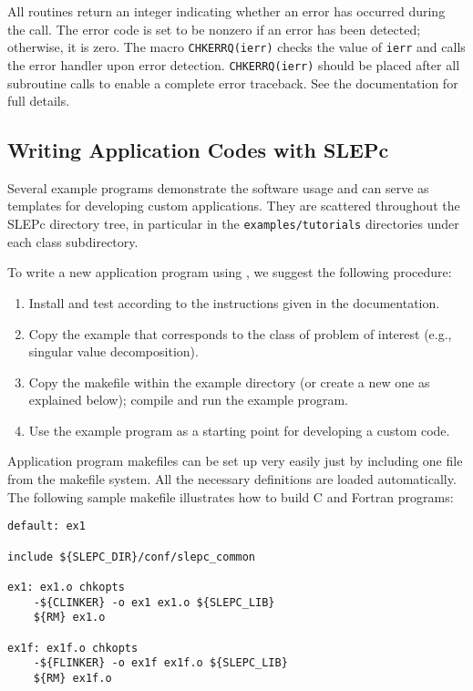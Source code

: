 	All \slepc routines return an integer indicating whether an error has occurred during the call. The error code is set to be nonzero if an error has been detected; otherwise, it is zero. The \petsc macro \Verb!CHKERRQ(ierr)! checks the value of \Verb!ierr! and calls the \petsc error handler upon error detection. \Verb!CHKERRQ(ierr)! should be placed after all subroutine calls to enable a complete error traceback. See the \petsc documentation for full details.

\subsection{Writing Application Codes with SLEPc}

Several example programs demonstrate the software usage and can serve as templates for developing custom applications. They are scattered throughout the SLEPc directory tree, in particular in the \Verb!examples/tutorials! directories under each class subdirectory.

To write a new application program using \slepc, we suggest the following procedure:
\begin{enumerate}
\item Install and test \slepc according to the instructions given in the documentation.
\item Copy the \slepc example that corresponds to the class of problem of interest (e.g., singular value decomposition).
\item Copy the makefile within the example directory (or create a new one as explained below); compile and run the example program.
\item Use the example program as a starting point for developing a custom code.
\end{enumerate}

	Application program makefiles can be set up very easily just by including one file from the \slepc makefile system. All the necessary \petsc{} definitions are loaded automatically. The following sample makefile illustrates how to build C and Fortran programs:

	\begin{Verbatim}[fontsize=\small]
default: ex1

include ${SLEPC_DIR}/conf/slepc_common

ex1: ex1.o chkopts
	-${CLINKER} -o ex1 ex1.o ${SLEPC_LIB}
	${RM} ex1.o

ex1f: ex1f.o chkopts
	-${FLINKER} -o ex1f ex1f.o ${SLEPC_LIB}
	${RM} ex1f.o
	\end{Verbatim}


